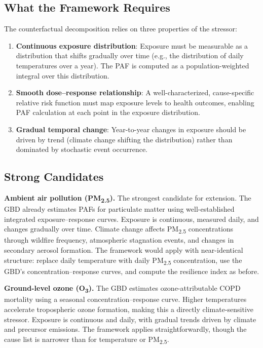 \documentclass[11pt,a4paper]{article}
\begin{document}
\subsection{What the Framework Requires}

The counterfactual decomposition relies on three properties of the stressor:
\begin{enumerate}[nosep]
  \item \textbf{Continuous exposure distribution}: Exposure must be measurable as a distribution that shifts gradually over time (e.g., the distribution of daily temperatures over a year). The PAF is computed as a population-weighted integral over this distribution.
  \item \textbf{Smooth dose--response relationship}: A well-characterized, cause-specific relative risk function must map exposure levels to health outcomes, enabling PAF calculation at each point in the exposure distribution.
  \item \textbf{Gradual temporal change}: Year-to-year changes in exposure should be driven by trend (climate change shifting the distribution) rather than dominated by stochastic event occurrence.
\end{enumerate}

\subsection{Strong Candidates}

\textbf{Ambient air pollution (PM\textsubscript{2.5}).} The strongest candidate for extension. The GBD already estimates PAFs for particulate matter using well-established integrated exposure--response curves. Exposure is continuous, measured daily, and changes gradually over time. Climate change affects PM\textsubscript{2.5} concentrations through wildfire frequency, atmospheric stagnation events, and changes in secondary aerosol formation. The framework would apply with near-identical structure: replace daily temperature with daily PM\textsubscript{2.5} concentration, use the GBD's concentration--response curves, and compute the resilience index as before.

\textbf{Ground-level ozone (O\textsubscript{3}).} The GBD estimates ozone-attributable COPD mortality using a seasonal concentration--response curve. Higher temperatures accelerate tropospheric ozone formation, making this a directly climate-sensitive stressor. Exposure is continuous and daily, with gradual trends driven by climate and precursor emissions. The framework applies straightforwardly, though the cause list is narrower than for temperature or PM\textsubscript{2.5}.
\end{document}
